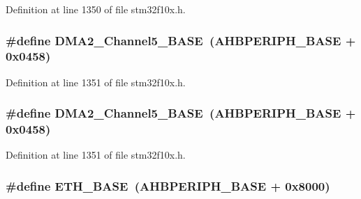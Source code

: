 Definition at line 1350 of file stm32f10x.\+h.

\subsubsection[{\texorpdfstring{D\+M\+A2\+\_\+\+Channel5\+\_\+\+B\+A\+SE}{DMA2_Channel5_BASE}}]{\setlength{\rightskip}{0pt plus 5cm}\#define D\+M\+A2\+\_\+\+Channel5\+\_\+\+B\+A\+SE~({\bf A\+H\+B\+P\+E\+R\+I\+P\+H\+\_\+\+B\+A\+SE} + 0x0458)}\hypertarget{group___peripheral__memory__map_ga1eea983a5d68bf36f4d19fbb07955ca1}{}\label{group___peripheral__memory__map_ga1eea983a5d68bf36f4d19fbb07955ca1}


Definition at line 1351 of file stm32f10x.\+h.

\subsubsection[{\texorpdfstring{D\+M\+A2\+\_\+\+Channel5\+\_\+\+B\+A\+SE}{DMA2_Channel5_BASE}}]{\setlength{\rightskip}{0pt plus 5cm}\#define D\+M\+A2\+\_\+\+Channel5\+\_\+\+B\+A\+SE~({\bf A\+H\+B\+P\+E\+R\+I\+P\+H\+\_\+\+B\+A\+SE} + 0x0458)}\hypertarget{group___peripheral__memory__map_ga1eea983a5d68bf36f4d19fbb07955ca1}{}\label{group___peripheral__memory__map_ga1eea983a5d68bf36f4d19fbb07955ca1}


Definition at line 1351 of file stm32f10x.\+h.

\subsubsection[{\texorpdfstring{E\+T\+H\+\_\+\+B\+A\+SE}{ETH_BASE}}]{\setlength{\rightskip}{0pt plus 5cm}\#define E\+T\+H\+\_\+\+B\+A\+SE~({\bf A\+H\+B\+P\+E\+R\+I\+P\+H\+\_\+\+B\+A\+SE} + 0x8000)}\hypertarget{group___peripheral__memory__map_gad965a7b1106ece575ed3da10c45c65cc}{}\label{group___peripheral__memory__map_gad965a7b1106ece575ed3da10c45c65cc}



